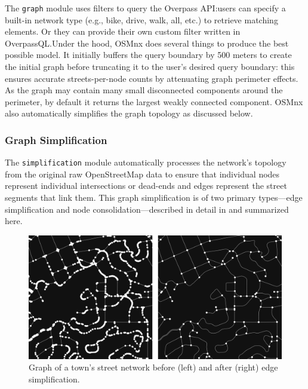 \documentclass[12pt,letterpaper]{article} %
\begin{document}
The \texttt{graph} module uses filters to query the Overpass API:\@ users can specify a built-in network type (e.g., bike, drive, walk, all, etc.) to retrieve matching elements. Or they can provide their own custom filter written in OverpassQL.\@ Under the hood, OSMnx does several things to produce the best possible model. It initially buffers the query boundary by 500 meters to create the initial graph before truncating it to the user's desired query boundary: this ensures accurate streets-per-node counts by attenuating graph perimeter effects. As the graph may contain many small disconnected components around the perimeter, by default it returns the largest weakly connected component. OSMnx also automatically simplifies the graph topology as discussed below.

\subsubsection{Graph Simplification}

The \texttt{simplification} module automatically processes the network's topology from the original raw OpenStreetMap data to ensure that individual nodes represent individual intersections or dead-ends and edges represent the street segments that link them. This graph simplification is of two primary types---edge simplification and node consolidation---described in detail in \citet{boeing_graph_2024} and summarized here.

\begin{figure}[tbp]
    \centering
    \includegraphics[width=1\textwidth]{fig_graph_simplification.png}
    \caption{Graph of a town's street network before (left) and after (right) edge simplification.}\label{fig:graph_simplification}
\end{figure}
\end{document}
